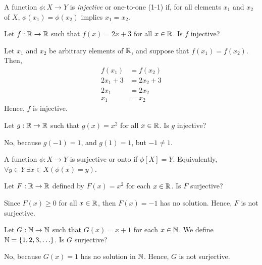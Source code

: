     \begin{dfn}
        A function \(\phi : X \to Y\) is \emph{injective} or one-to-one (1-1) if, for all elements \(x_1\) and \(x_2\) of \(X\), \(\phi(x_1) = \phi(x_2)\) implies \(x_1 = x_2\).
    \end{dfn}

    \begin{example}
        Let \(f : \mathbb{R}\to\mathbb{R}\) such that \(f(x) = 2x + 3\) for all \(x\in\mathbb{R}\). Is \(f\) injective?

        Let \(x_1\) and \(x_2\) be arbitrary elements of \(\mathbb{R}\), and suppose that \(f(x_1) = f(x_2)\). Then,
        \begin{align*}
            f(x_1) &= f(x_2) \\
            2x_1 + 3 &= 2x_2 + 3 \\
            2x_1 &= 2x_2 \\
            x_1 &= x_2
        \end{align*}
        Hence, \(f\) is injective.
    \end{example}

    \begin{example}
        Let \(g : \mathbb{R}\to\mathbb{R}\) such that \(g(x) = x^2\) for all \(x\in\mathbb{R}\). Is \(g\) injective?

        No, because \(g(-1) = 1\), and \(g(1) = 1\), but \(-1 \neq 1\).
    \end{example}

    \begin{dfn}
        A function \(\phi : X \to Y\) is surjective or onto if \(\phi[X] = Y\). Equivalently, \(\forall y\!\in\! Y\  \exists x\!\in\! X (\phi(x) = y)\).
    \end{dfn}

    \begin{example}
        Let \(F : \mathbb{R}\to\mathbb{R}\) defined by \(F(x) = x^2\) for each \(x\in\mathbb{R}\). Is \(F\) surjective?

        Since \(F(x) \geq 0\) for all \(x\in\mathbb{R}\), then \(F(x) = -1\) has no solution. Hence, \(F\) is not surjective.
    \end{example}

    \begin{example}
        Let \(G : \mathbb{N} \to \mathbb{N}\) such that \(G(x) = x + 1\) for each \(x\in\mathbb{N}\). We define \(\mathbb{N} = \{1, 2, 3, \ldots\}\). Is \(G\) surjective?

        No, because \(G(x) = 1\) has no solution in \(\mathbb{N}\). Hence, \(G\) is not surjective.
    \end{example}

